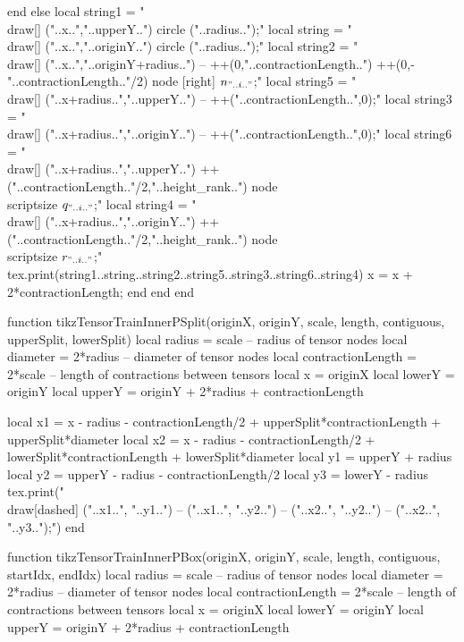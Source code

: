\begin{luacode*}
				 end
			else
				 local string1 = "\\draw[] ("..x..","..upperY..") circle ("..radius..");"
				 local string = "\\draw[] ("..x..","..originY..") circle ("..radius..");"
				 local string2 = "\\draw[] ("..x..","..originY+radius..") -- ++(0,"..contractionLength..") ++(0,-"..contractionLength.."/2) node [right] {$n_{"..i.."}$};"
				 local string5 = "\\draw[] ("..x+radius..","..upperY..") -- ++("..contractionLength..",0);"
				 local string3 = "\\draw[] ("..x+radius..","..originY..") -- ++("..contractionLength..",0);"
				 local string6 = "\\draw[] ("..x+radius..","..upperY..") ++("..contractionLength.."/2,"..height_rank..") node {\\scriptsize $q_{"..i.."}$};"
				 local string4 = "\\draw[] ("..x+radius..","..originY..") ++("..contractionLength.."/2,"..height_rank..") node {\\scriptsize $r_{"..i.."}$};"
				 tex.print(string1..string..string2..string5..string3..string6..string4)
				 x = x + 2*contractionLength;
			end
	 end
end

function tikzTensorTrainInnerPSplit(originX, originY, scale, length, contiguous, upperSplit, lowerSplit)
	 local radius = scale              -- radius of tensor nodes
	 local diameter = 2*radius         -- diameter of tensor nodes
	 local contractionLength = 2*scale -- length of contractions between tensors
	 local x = originX
	 local lowerY = originY
	 local upperY = originY + 2*radius + contractionLength

	 local x1 = x - radius - contractionLength/2 + upperSplit*contractionLength + upperSplit*diameter
	 local x2 = x - radius - contractionLength/2 + lowerSplit*contractionLength + lowerSplit*diameter
	 local y1 = upperY + radius
	 local y2 = upperY - radius - contractionLength/2
	 local y3 = lowerY - radius
	 tex.print("\\draw[dashed] ("..x1..", "..y1..") -- ("..x1..", "..y2..") -- ("..x2..", "..y2..") -- ("..x2..", "..y3..");")
end

function tikzTensorTrainInnerPBox(originX, originY, scale, length, contiguous, startIdx, endIdx)
	 local radius = scale              -- radius of tensor nodes
	 local diameter = 2*radius         -- diameter of tensor nodes
	 local contractionLength = 2*scale -- length of contractions between tensors
	 local x = originX
	 local lowerY = originY
	 local upperY = originY + 2*radius + contractionLength


\end{luacode*}

